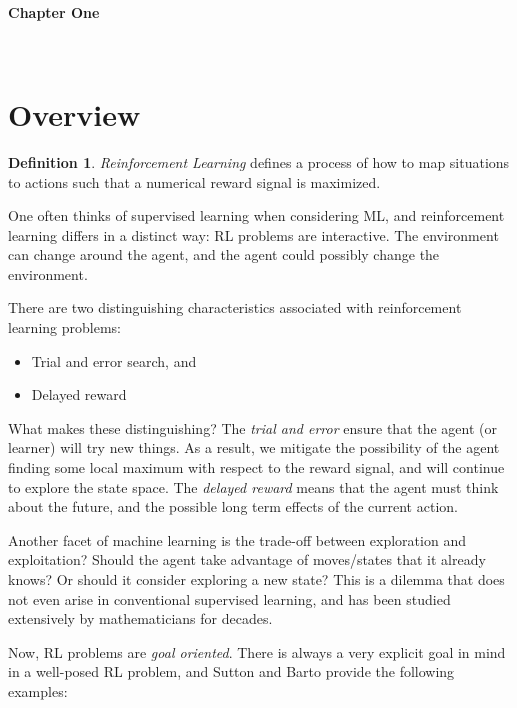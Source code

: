 \documentclass[11pt]{article}
\theoremstyle{definition}
\newtheorem{definition}{Definition}
\begin{document}
~
~

\begin{center}
  {
	\fontsize{1.5cm}{1.5cm}
        \textcolor{CalPolyGreen}{\textbf{Chapter One}}
  }

\end{center}

~
~


\section*{\textcolor{CalPolyGreen}{Overview}}

\begin{definition}
\textit{Reinforcement Learning} defines a process of how to map situations to actions such that a numerical reward signal is maximized.
\end{definition}

One often thinks of supervised learning when considering ML, and reinforcement learning differs in a distinct way: RL problems are interactive. The environment can change around the agent, and the agent could possibly change the environment.

There are two distinguishing characteristics associated with reinforcement learning problems:

\begin{itemize}
    \item Trial and error search, and
    \item Delayed reward
\end{itemize}

What makes these distinguishing?  The \textit{trial and error} ensure that the agent (or learner) will try new things.  As a result, we mitigate the possibility of the agent finding some local maximum with respect to the reward signal, and will continue to explore the state space.  The \textit{delayed reward} means that the agent must think about the future, and the possible long term effects of the current action.

Another facet of machine learning is the trade-off between exploration and exploitation? Should the agent take advantage of moves/states that it already knows? Or should it consider exploring a new state? This is a dilemma that does not even arise in conventional supervised learning, and has been studied extensively by mathematicians for decades.

Now, RL problems are \textit{goal oriented}.  There is always a very explicit goal in mind in a well-posed RL problem, and Sutton and Barto provide the following examples:
\end{document}
